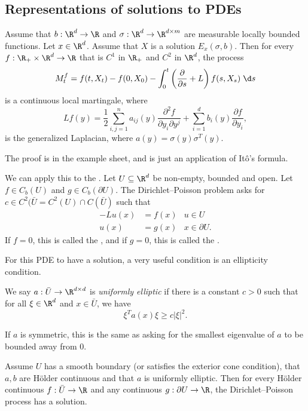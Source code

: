 \documentclass[a4paper]{article}
\begin{document}
\subsection{Representations of solutions to PDEs}
\begin{prop}
  Assume that $b: \R^d \to \R$ and $\sigma: \R^d \to \R^{d \times m}$ are measurable locally bounded functions. Let $x \in \R^d$. Assume that $X$ is a solution $E_x(\sigma, b)$.  Then for every $f: \R_+ \times \R^d \to \R$ that is $C^1$ in $\R_+$ and $C^2$ in $\R^d$, the process
  \[
    M_t^f = f(t, X_t) - f(0, X_0) - \int_0^t \left(\frac{\partial}{\partial s} + L\right)f(s, X_s)\;\d s
  \]
  is a continuous local martingale, where
  \[
    Lf(y) = \frac{1}{2} \sum_{i, j = 1}^n a_{ij}(y) \frac{\partial^2 f}{\partial y_i \partial y^j} + \sum_{i = 1}^d b_i (y) \frac{\partial f}{\partial y_i},
  \]
  is the generalized Laplacian, where $a(y) = \sigma(y) \sigma^T(y)$.\fakeqed
\end{prop}
The proof is in the example sheet, and is just an application of It\^o's formula.

We can apply this to the . Let $U \subseteq \R^d$ be non-empty, bounded and open. Let $f \in C_b(U)$ and $g \in C_b(\partial U)$. The Dirichlet--Poisson problem asks for $c \in C^2(\bar{U} = C^2(U) \cap C(\bar{U})$ such that
\begin{align*}
  -Lu(x) &= f(x) & u \in U\\
  u(x) &= g(x) & x \in \partial U.
\end{align*}
If $f = 0$, this is called the , and if $g = 0$, this is called the .

For this PDE to have a solution, a very useful condition is an ellipticity condition.
\begin{defi}
  We say $a: \bar{U} \to \R^{d \times d}$ is \emph{uniformly elliptic} if there is a constant $c > 0$ such that for all $\xi \in \R^d$ and $x \in \bar{U}$, we have
  \[
    \xi^T a(x) \xi \geq c |\xi|^2.
  \]
\end{defi}
If $a$ is symmetric, this is the same as asking for the smallest eigenvalue of $a$ to be bounded away from $0$.
\begin{thm}
  Assume $U$ has a smooth boundary (or satisfies the exterior cone condition), that $a, b$ are H\"older continuous and that $a$ is uniformly elliptic. Then for every H\"older continuous $f: \bar{U} \to \R$ and any continuous $g: \partial U \to \R$, the Dirichlet--Poisson process has a solution.\fakeqed
\end{thm}
\end{document}
